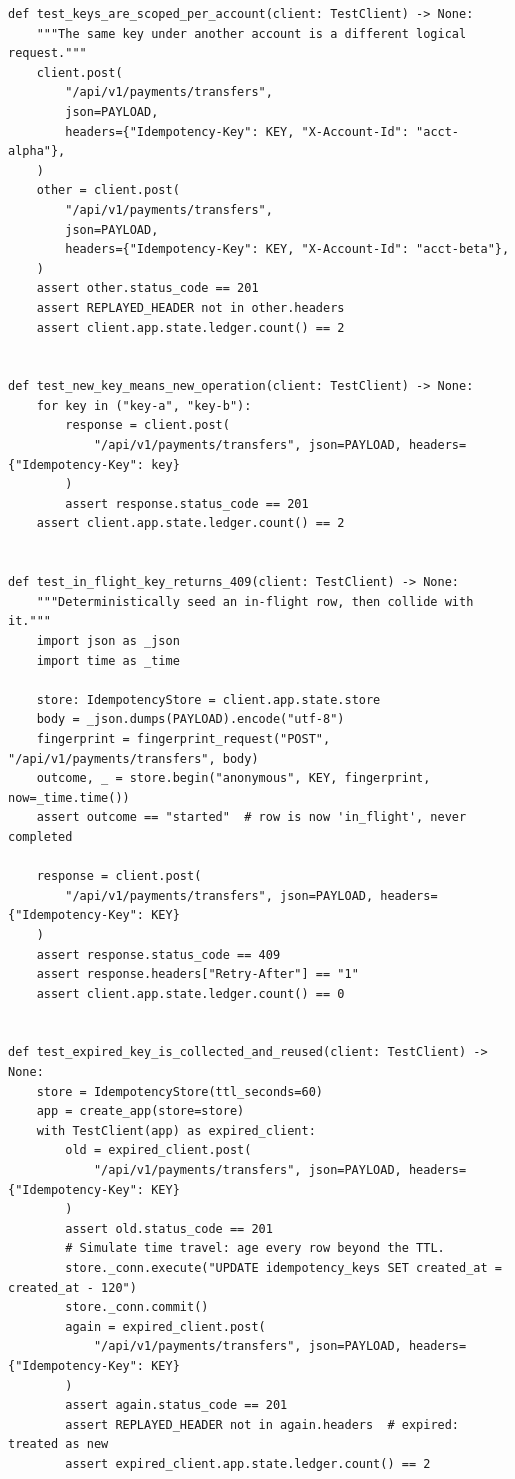 \begin{verbatim}
def test_keys_are_scoped_per_account(client: TestClient) -> None:
    """The same key under another account is a different logical request."""
    client.post(
        "/api/v1/payments/transfers",
        json=PAYLOAD,
        headers={"Idempotency-Key": KEY, "X-Account-Id": "acct-alpha"},
    )
    other = client.post(
        "/api/v1/payments/transfers",
        json=PAYLOAD,
        headers={"Idempotency-Key": KEY, "X-Account-Id": "acct-beta"},
    )
    assert other.status_code == 201
    assert REPLAYED_HEADER not in other.headers
    assert client.app.state.ledger.count() == 2


def test_new_key_means_new_operation(client: TestClient) -> None:
    for key in ("key-a", "key-b"):
        response = client.post(
            "/api/v1/payments/transfers", json=PAYLOAD, headers={"Idempotency-Key": key}
        )
        assert response.status_code == 201
    assert client.app.state.ledger.count() == 2


def test_in_flight_key_returns_409(client: TestClient) -> None:
    """Deterministically seed an in-flight row, then collide with it."""
    import json as _json
    import time as _time

    store: IdempotencyStore = client.app.state.store
    body = _json.dumps(PAYLOAD).encode("utf-8")
    fingerprint = fingerprint_request("POST", "/api/v1/payments/transfers", body)
    outcome, _ = store.begin("anonymous", KEY, fingerprint, now=_time.time())
    assert outcome == "started"  # row is now 'in_flight', never completed

    response = client.post(
        "/api/v1/payments/transfers", json=PAYLOAD, headers={"Idempotency-Key": KEY}
    )
    assert response.status_code == 409
    assert response.headers["Retry-After"] == "1"
    assert client.app.state.ledger.count() == 0


def test_expired_key_is_collected_and_reused(client: TestClient) -> None:
    store = IdempotencyStore(ttl_seconds=60)
    app = create_app(store=store)
    with TestClient(app) as expired_client:
        old = expired_client.post(
            "/api/v1/payments/transfers", json=PAYLOAD, headers={"Idempotency-Key": KEY}
        )
        assert old.status_code == 201
        # Simulate time travel: age every row beyond the TTL.
        store._conn.execute("UPDATE idempotency_keys SET created_at = created_at - 120")
        store._conn.commit()
        again = expired_client.post(
            "/api/v1/payments/transfers", json=PAYLOAD, headers={"Idempotency-Key": KEY}
        )
        assert again.status_code == 201
        assert REPLAYED_HEADER not in again.headers  # expired: treated as new
        assert expired_client.app.state.ledger.count() == 2



\end{verbatim}
